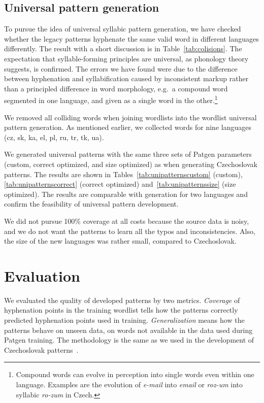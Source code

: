 \documentclass{csbulletin}
\let\stress=\emph
\let\program=\textrm %
\newcommand{\word}[1]{\textit{#1}\xspace}
\newcommand{\Patgen}{\program{Patgen}\xspace}
\begin{document}
\subsection{Universal pattern generation}

To pursue the idea of universal syllabic pattern generation, we have checked whether the legacy patterns hyphenate the same valid word in different languages differently.
The result with a short discussion is in Table~\ref{tab:colisions}.
The expectation that syllable-forming principles are universal, as phonology theory suggests, is confirmed. The errors we have found were due to the difference between hyphenation and syllabification caused by inconsistent markup rather than a principled difference in word morphology, e.g.\ a compound word segmented in one language, and given as a single word in the other.\footnote{Compound words can evolve in perception into single words even within one language.
Examples are the evolution of \word{e-mail} into \word{email} or
\word{roz-um} into syllabic \word{ro-zum} in Czech.}





We removed all colliding words when joining wordlists into
the wordlist universal pattern generation. As mentioned earlier, we collected words for nine languages (cz, sk, ka, el, pl, ru, tr, tk, ua).

We generated universal patterns with the same three sets of \Patgen parameters (custom, correct optimized, and size optimized) as when generating Czechoslovak patterns.
The results are shown in Tables~\ref{tab:unipatternscustom} (custom), \ref{tab:unipatternscorrect} (correct optimized) and~\ref{tab:unipatternssize} (size optimized).
The results are comparable with generation for two languages and confirm the feasibility of universal pattern development.

We did not pursue 100\% coverage at all costs because the source data is noisy, and we do not want the patterns to learn all the typos and inconsistencies.
Also, the size of the new languages was rather small, compared to Czechoslovak.


\section{Evaluation}
\label{sec:evaluation}
We evaluated the quality of developed patterns by two metrics.
\stress{Coverage} of hyphenation points in the training wordlist tells how the patterns correctly predicted hyphenation points used in training. 
\stress{Generalization} means how the patterns behave on unseen data, on words not available in the data used during \Patgen training.
The methodology is the same as we used in the development of Czechoslovak patterns~\cite{tex:sojkas2021czechoslovak}.
\end{document}
